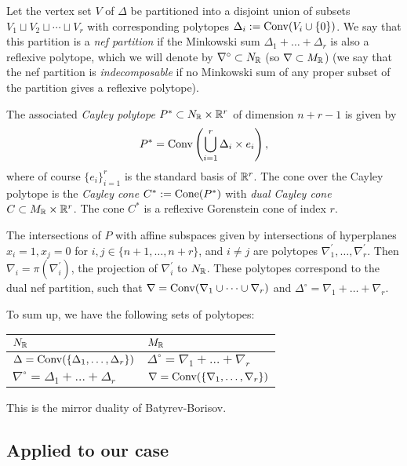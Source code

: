 \documentclass[11pt, english]{article}
\begin{document}
Let the vertex set $V$ of $\Delta$ be partitioned into a disjoint union of subsets $V_1 \sqcup V_2 \sqcup \cdots \sqcup V_r$ with corresponding polytopes $\Delta_i := \operatorname{Conv}( V_i \cup \{ 0\})$. We say that this partition is a \emph{nef partition} if the Minkowski sum $ \Delta_1 +\ldots+\Delta_r$ is also a reflexive polytope, which we will denote by $\nabla^\circ \subset N_{\mathbb{R}}$ (so $\nabla \subset M_{\mathbb{R}}$) (we say that the nef partition is \emph{indecomposable} if no Minkowski sum of any proper subset of the partition gives a reflexive polytope).

The associated \emph{Cayley polytope} $P^\ast \subset N_{\mathbb{R}} \times \mathbb{R}^r$ of dimension $n+r-1$ is given by 
\[
P^\ast = \operatorname{Conv} \left( \bigcup_{i=1}^r \Delta_i \times e_i \right),
\]
where of course $\{e_i\}_{i=1}^r$ is the standard basis of $\mathbb{R}^r$. The cone over the Cayley polytope is the \emph{Cayley cone} $C^\ast := \operatorname{Cone}(P^\ast)$ with \emph{dual Cayley cone} $C \subset M_{\mathbb{R}} \times \mathbb{R}^r$. The cone $C^\ast$ is a reflexive Gorenstein cone of index $r$.

The intersections of $P$ with affine subspaces given by intersections of hyperplanes $x_i=1,x_j=0$ for $i,j \in \{n+1,\ldots, n+r\}$, and $i\neq j$ are polytopes $\nabla_1^\prime,\ldots, \nabla_r^\prime$. Then $\nabla_i = \pi(\nabla_i^\prime)$, the projection of $\nabla_i^\prime$ to $N_{\mathbb{R}}$. These polytopes correspond to the dual nef partition, such that $\nabla = \operatorname{Conv}(\nabla_1 \cup \cdots \cup \nabla_r)$ and $\Delta^\circ = \nabla_1 + \ldots + \nabla_r$. 

To sum up, we have the following sets of polytopes:

\begin{center}
\begin{tabular}{l l}
  $N_{\mathbb{R}}$ & $M_{\mathbb{R}}$ \\
\hline
 $\Delta=\operatorname{Conv}(\{\Delta_1,\ldots,\Delta_r\})$ & $\Delta^\circ=\nabla_1+\ldots+\nabla_r$ \\
$\nabla^\circ = \Delta_1+\ldots+\Delta_r$ & $\nabla=\operatorname{Conv}(\{\nabla_1,\ldots,\nabla_r\})$ \\

\end{tabular}
\end{center}

This is the mirror duality of Batyrev-Borisov.

\subsection{Applied to our case}
\end{document}
